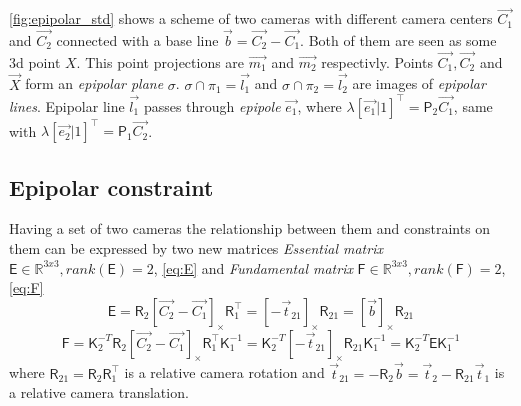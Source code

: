\autoref{fig:epipolar_std} shows a scheme of two cameras with different camera centers $\vec{C_1}$ and $\vec{C_2}$ connected with a base line $\vec{b} = \vec{C_2} - \vec{C_1}$. 
Both of them are seen as some 3d point $X$. 
This point projections are $\vec{m_1}$ and $\vec{m_2}$ respectivly. 
Points $\vec{C_1}, \vec{C_2}$ and $\vec{X}$ form an \textit{epipolar plane} $\sigma$.
$\sigma \cap \pi_1 = \vec{l_1}$ and $\sigma \cap \pi_2 = \vec{l_2}$ are images of \textit{epipolar lines}. 
Epipolar line $\vec{l_1}$ passes through \textit{epipole} $\vec{e_1}$, where $\lambda [\vec{e_1} | 1]^\top = \pmb{\mathsf{P}}_2 \vec{C_1}$, same with $\lambda [\vec{e_2} | 1]^\top = \pmb{\mathsf{P}}_1 \vec{C_2}$.

\subsection{Epipolar constraint}

Having a set of two cameras the relationship between them and constraints on them can be expressed by two new matrices \textit{Essential matrix} $\pmb{\mathsf{E}} \in \mathbb{R}^{3x3}, rank(\pmb{\mathsf{E}}) = 2$, \autoref{eq:E} and \textit{Fundamental matrix} $\pmb{\mathsf{F}} \in \mathbb{R}^{3x3}, rank(\pmb{\mathsf{F}}) = 2$, \autoref{eq:F}
\begin{equation}
    \label{eq:E}
    \pmb{\mathsf{E}} = \pmb{\mathsf{R}}_2 [\vec{C_2} - \vec{C_1}]_{\times} \pmb{\mathsf{R}}_1^\top = [-\vec{t}_{21}]_{\times} \pmb{\mathsf{R}}_{21} = [\vec{b}]_{\times} \pmb{\mathsf{R}}_{21}
\end{equation}
\begin{equation}
    \label{eq:F}
    \pmb{\mathsf{F}} = \pmb{\mathsf{K}}_2^{-T} \pmb{\mathsf{R}}_2 [\vec{C_2} - \vec{C_1}]_{\times} \pmb{\mathsf{R}}_1^\top \pmb{\mathsf{K}}_1^{-1} = 
    \pmb{\mathsf{K}}_2^{-T} [-\vec{t}_{21}]_{\times} \pmb{\mathsf{R}}_{21} \pmb{\mathsf{K}}_1^{-1} = 
    \pmb{\mathsf{K}}_2^{-T} \pmb{\mathsf{E}} \pmb{\mathsf{K}}_1^{-1}
\end{equation}
where 
$\pmb{\mathsf{R}}_{21} = \pmb{\mathsf{R}}_2 \pmb{\mathsf{R}}_1^\top$ is a relative camera rotation and 
$\vec{t}_{21} = -\pmb{\mathsf{R}}_2 \vec{b} = \vec{t}_2 - \pmb{\mathsf{R}}_{21}\vec{t}_1$ is a relative camera translation.

